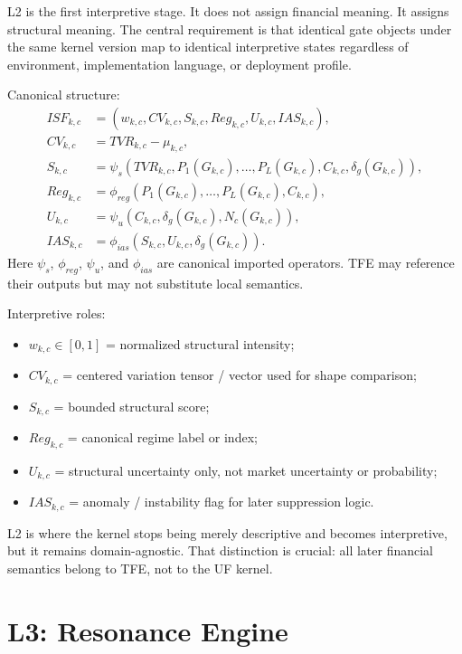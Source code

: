 L2 is the first interpretive stage. It does not assign financial meaning. It assigns structural meaning. The central requirement is that identical gate objects under the same kernel version map to identical interpretive states regardless of environment, implementation language, or deployment profile.

Canonical structure:
\begin{align*}
ISF_{k,c} &= (w_{k,c},CV_{k,c},S_{k,c},Reg_{k,c},U_{k,c},IAS_{k,c}),\\
CV_{k,c} &= TVR_{k,c}-\mu_{k,c},\\
S_{k,c} &= \psi_s\!\left(TVR_{k,c},P_1(G_{k,c}),\dots,P_L(G_{k,c}),C_{k,c},\delta_g(G_{k,c})\right),\\
Reg_{k,c} &= \phi_{reg}\!\left(P_1(G_{k,c}),\dots,P_L(G_{k,c}),C_{k,c}\right),\\
U_{k,c} &= \psi_u\!\left(C_{k,c},\delta_g(G_{k,c}),N_c(G_{k,c})\right),\\
IAS_{k,c} &= \phi_{ias}\!\left(S_{k,c},U_{k,c},\delta_g(G_{k,c})\right).
\end{align*}
Here $\psi_s$, $\phi_{reg}$, $\psi_u$, and $\phi_{ias}$ are canonical imported operators. TFE may reference their outputs but may not substitute local semantics.

Interpretive roles:
\begin{itemize}
    \item $w_{k,c}\in[0,1]$ = normalized structural intensity;
    \item $CV_{k,c}$ = centered variation tensor / vector used for shape comparison;
    \item $S_{k,c}$ = bounded structural score;
    \item $Reg_{k,c}$ = canonical regime label or index;
    \item $U_{k,c}$ = structural uncertainty only, not market uncertainty or probability;
    \item $IAS_{k,c}$ = anomaly / instability flag for later suppression logic.
\end{itemize}

L2 is where the kernel stops being merely descriptive and becomes interpretive, but it remains domain-agnostic. That distinction is crucial: all later financial semantics belong to TFE, not to the UF kernel.

\section{L3: Resonance Engine}

